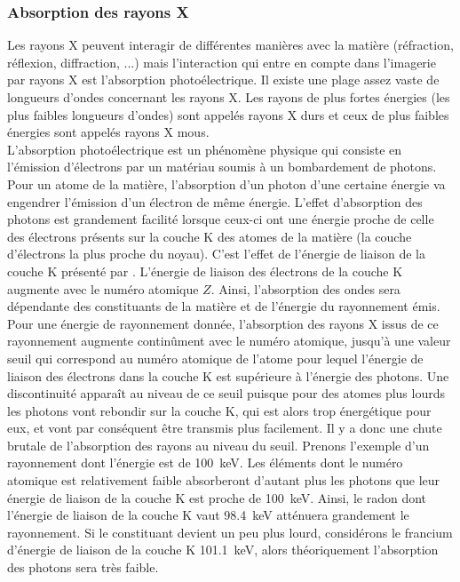 		\subsubsection{Absorption des rayons X}
			Les rayons X peuvent interagir de différentes manières avec la matière (réfraction, réflexion, diffraction, ...) mais l'interaction qui entre en compte dans l'imagerie par rayons X est l'absorption photoélectrique. Il existe une plage assez vaste de longueurs d'ondes concernant les rayons X. Les rayons de plus fortes énergies (les plus faibles longueurs d'ondes) sont appelés rayons X durs et ceux de plus faibles énergies sont appelés rayons X mous.
			\\L'absorption photoélectrique est un phénomène physique qui consiste en l'émission d'électrons par un matériau soumis à un bombardement de photons. Pour un atome de la matière, l'absorption d'un photon d'une certaine énergie va engendrer l'émission d'un électron de même énergie. L'effet d'absorption des photons est grandement facilité lorsque ceux-ci ont une énergie proche de celle des électrons présents sur la couche K des atomes de la matière (la couche d'électrons la plus proche du noyau). C'est l'effet de l'énergie de liaison de la couche K présenté par \citet{nielsen_elements_2011}. L'énergie de liaison des électrons de la couche K augmente avec le numéro atomique $Z$. Ainsi, l'absorption des ondes sera dépendante des constituants de la matière et de l'énergie du rayonnement émis.
			\\Pour une énergie de rayonnement donnée, l'absorption des rayons X issus de ce rayonnement augmente continûment avec le numéro atomique, jusqu'à une valeur seuil qui correspond au numéro atomique de l'atome pour lequel l'énergie de liaison des électrons dans la couche K est supérieure à l'énergie des photons. Une discontinuité apparaît au niveau de ce seuil puisque pour des atomes plus lourds les photons vont rebondir sur la couche K, qui est alors trop énergétique pour eux, et vont par conséquent être transmis plus facilement. Il y a donc une chute brutale de l'absorption des rayons au niveau du seuil. Prenons l'exemple d'un rayonnement dont l'énergie est de \SI{100}{\kilo\electronvolt}. Les éléments dont le numéro atomique est relativement faible absorberont d'autant plus les photons que leur énergie de liaison de la couche K est proche de \SI{100}{\kilo\electronvolt}. Ainsi, le radon dont l'énergie de liaison de la couche K vaut \SI{98.4}{\kilo\electronvolt} atténuera grandement le rayonnement. Si le constituant devient un peu plus lourd, considérons le francium d'énergie de liaison de la couche K \SI{101.1}{\kilo\electronvolt}, alors théoriquement l'absorption des photons sera très faible.
